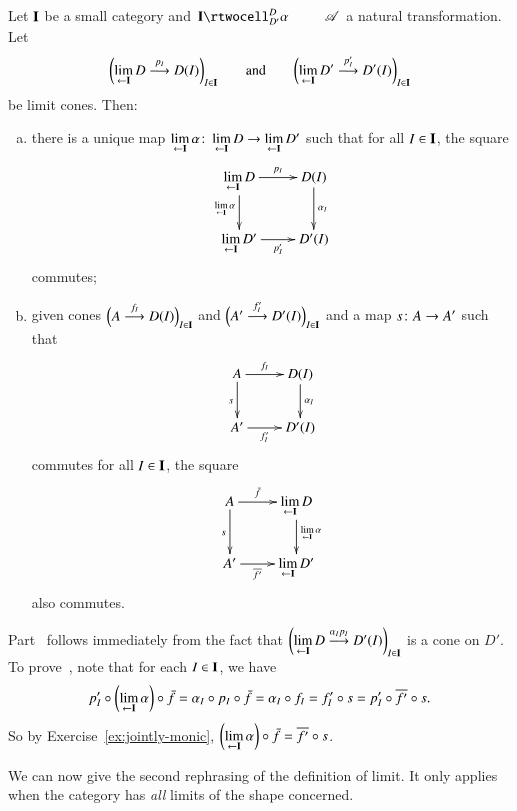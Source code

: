\begin{lemma}   
\label{lemma:lim-functorial}
Let $\mathbf{I}$ be a small category and $\xymatrix@1{\scat{I}
  \rtwocell^D_{D'}{\alpha} &\cat{A}}$ a natural transformation.  Let
\[
\biggl(\lim\limits_{\leftarrow \mathbf{I}} D \stackrel{p_I}{\longrightarrow} D(I)\biggr)_{I \in \mathbf{I}}
\qquad
\text{and}
\qquad
\biggl(\lim\limits_{\leftarrow \mathbf{I}} D' \stackrel{p'_I}{\longrightarrow} D'(I)\biggr)_{I \in \mathbf{I}}
\]
be limit cones.  Then:
% 
\begin{enumerate}[(b)]
\item   
\label{lemma:lim-functorial:induced}
there is a unique map%
%
%
$\lt{\scat{I}} \alpha \from \lt{\scat{I}} D \to \lt{\scat{I}} D'$ such that
for all $I \in \mathbf{I}$, the square
\[
\xymatrix{
\lt{\scat{I}} D \ar[r]^-{p_I} \ar[d]_{\lt{\scat{I}} \alpha}     &
D(I) \ar[d]^{\alpha_I}    \\
\lt{\scat{I}} D' \ar[r]_-{p'_I}         &
D'(I)
}
\]
commutes;

\item   
\label{lemma:lim-functorial:commutes}
given cones $\Bigl(A \stackrel{f_I}{\longrightarrow} D(I)\Bigr)_{I \in \mathbf{I}}$ and $\Bigl(A'
\stackrel{f'_I}{\longrightarrow} D'(I)\Bigr)_{I \in \mathbf{I}}$ and a map $s\from A \to A'$
such that
\[
\xymatrix{
A \ar[r]^-{f_I} \ar[d]_s        &
D(I) \ar[d]^{\alpha_I}  \\
A' \ar[r]_-{f'_I}       &
D'(I)
}
\]
commutes for all $I \in \mathbf{I}$, the square
\[
\xymatrix{
A \ar[r]^-{\bar{f}} \ar[d]_s        &
\lt{\scat{I}} D \ar[d]^{\lt{\scat{I}} \alpha}  \\
A' \ar[r]_-{\ovln{f'}}       &
\lt{\scat{I}} D'
}
\]
also commutes.
\end{enumerate}
\end{lemma}

\begin{pf}
Part~ follows immediately from the fact
that $\biggl(\lim\limits_{\leftarrow \mathbf{I}} D \stackrel{\alpha_I p_I}{\longrightarrow} D'(I)\biggr)_{I \in
  \mathbf{I}}$ is a cone on $D'$.  To
prove~, note that for each $I \in
\mathbf{I}$, we have
\[
p'_I \mathbin{\circ} \biggl(\lim\limits_{\leftarrow \mathbf{I}} \alpha\biggr) \mathbin{\circ} \bar{f}
=
\alpha_I \mathbin{\circ} p_I \mathbin{\circ} \bar{f}
=
\alpha_I \mathbin{\circ} f_I
=
f'_I \mathbin{\circ} s
=
p'_I \mathbin{\circ} \overline{f'} \mathbin{\circ} s.
\]
So by Exercise~\ref{ex:jointly-monic},
$\biggl(\lim\limits_{\leftarrow \mathbf{I}} \alpha \biggr) \mathbin{\circ} \bar{f} = \overline{f'} \mathbin{\circ} s$.
\end{pf}

We can now give the second rephrasing of the definition of limit.  It only
applies when the category has \emph{all} limits of the shape concerned.

